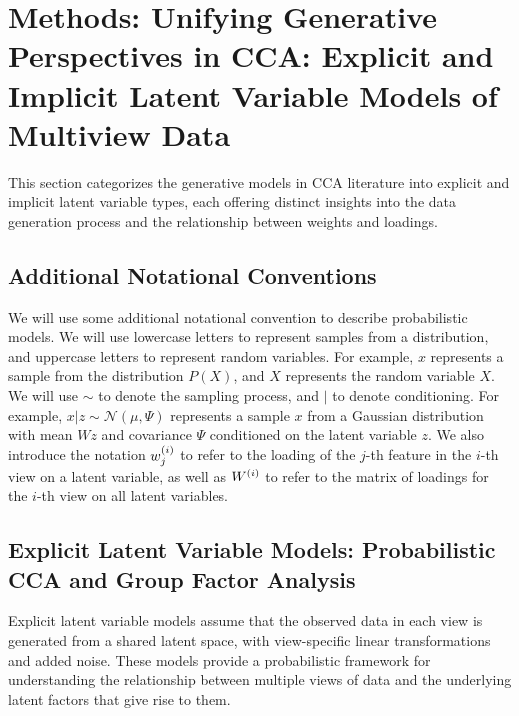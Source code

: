 \section{Methods: Unifying Generative Perspectives in CCA: Explicit and Implicit Latent Variable Models of Multiview Data}

This section categorizes the generative models in CCA literature into explicit and implicit latent variable types, each offering distinct insights into the data generation process and the relationship between weights and loadings.

\subsection{Additional Notational Conventions}

We will use some additional notational convention to describe probabilistic models.
We will use lowercase letters to represent samples from a distribution, and uppercase letters to represent random variables.
For example, \(x\) represents a sample from the distribution \(P(X)\), and \(X\) represents the random variable \(X\).
We will use $\sim$ to denote the sampling process, and $|$ to denote conditioning.
For example, \(x | z \sim \mathcal{N}(\mu, \Psi)\) represents a sample \(x\) from a Gaussian distribution with mean \(Wz\) and covariance \(\Psi\) conditioned on the latent variable \(z\).
We also introduce the notation \(w^{(i)}_{j}\) to refer to the loading of the \(j\)-th feature in the \(i\)-th view on a latent variable, as well as \(W^{(i)}\) to refer to the matrix of loadings for the \(i\)-th view on all latent variables.

\subsection{Explicit Latent Variable Models: Probabilistic CCA and Group Factor Analysis}

Explicit latent variable models assume that the observed data in each view is generated from a shared latent space, with view-specific linear transformations and added noise. These models provide a probabilistic framework for understanding the relationship between multiple views of data and the underlying latent factors that give rise to them.

